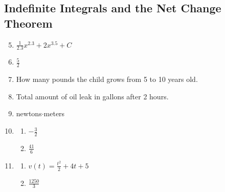 \documentclass{article} \usepackage[margin=1in]{geometry}
\begin{document}
\subsection{Indefinite Integrals and the Net Change Theorem}
\begin{enumerate}
	\setcounter{enumi}{4}
	\item $\frac{1}{2.3}x^{2.3}+2x^{3.5}+C$
	      \setcounter{enumi}{38}
	\item $\frac{5}{2}$
	      \setcounter{enumi}{46}
	\item How many pounds the child grows from 5 to 10 years old.
	      \setcounter{enumi}{48}
	\item Total amount of oil leak in gallons after 2 hours.
	      \setcounter{enumi}{52}
	\item newtons$\cdot$meters
	      \setcounter{enumi}{54}
	\item \begin{enumerate}
		      \item $-\frac{3}{2}$
		      \item $\frac{41}{6}$
	      \end{enumerate}
	      \setcounter{enumi}{56}
	\item \begin{enumerate}
		      \item $v(t)=\frac{t^2}{2}+4t+5$
		      \item $\frac{1250}{3}$
	      \end{enumerate}
\end{enumerate}
\end{document}
